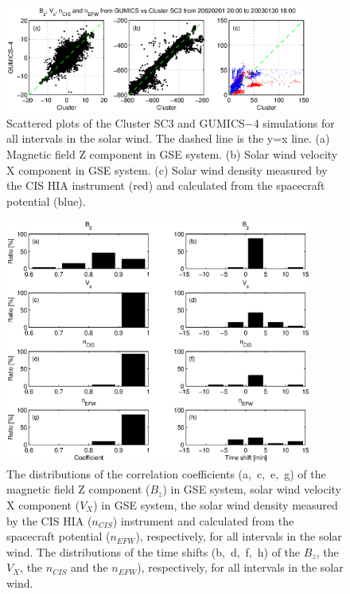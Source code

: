 \documentclass[linenumbers,draft]{agujournal}
\begin{document}
\pagebreak

\begin{figure}[h]
\centering
\includegraphics[width=0.9\textwidth,angle=0]{swe-2020-corr-f04.eps}
\caption{Scattered plots of the Cluster SC3 and GUMICS$-$4 simulations for all intervals in the solar wind. The dashed line is the y=x line. (a) Magnetic field Z component in GSE system. (b) Solar wind velocity X component in GSE system. (c) Solar wind density measured by the CIS HIA instrument (red) and calculated from the spacecraft potential (blue).}
\label{fig:swscatplot}
\end{figure}

\pagebreak

\begin{figure}[h]
\centering
\includegraphics[width=0.9\textwidth,angle=0]{swe-2020-corr-f05.eps}  
\caption{The distributions of the correlation coefficients (a,~c,~e,~g) of the magnetic field Z component ($B_z$) in GSE system, solar wind velocity X component ($V_X$) in GSE system, the solar wind density measured by the CIS HIA ($n_{CIS}$) instrument and calculated from the spacecraft potential ($n_{EFW}$), respectively, for all intervals in the solar wind. The distributions of the time shifts (b,~d,~f,~h) of the $B_z$, the $V_X$, the $n_{CIS}$ and the $n_{EFW}$), respectively, for all intervals in the solar wind.}
\label{fig:swcorrplot}
\end{figure}
\end{document}
